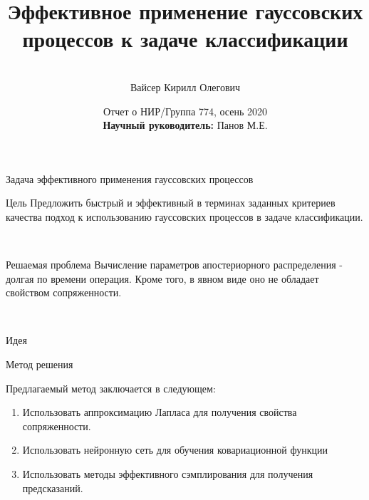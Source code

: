 \documentclass[hyperref={unicode}]{beamer}
\title[\hbox to 56mm{Эффективное применение гауссовских процессов \hfill\insertframenumber\,/\,\inserttotalframenumber}]
{Эффективное применение гауссовских процессов к задаче классификации}
\author[К.\,О. Вайсер]{\large \\Вайсер Кирилл Олегович}
\institute{\large
Московский физико-технический институт}
\date{\footnotesize{Отчет о НИР/Группа 774, осень 2020\\\textbf{Научный руководитель:} Панов М.Е.}}
\begin{document}
\begin{frame}
\titlepage
\end{frame}
\begin{frame}{Задача эффективного применения гауссовских процессов}

\begin{block}{Цель}
Предложить быстрый и эффективный в терминах заданных критериев качества подход к использованию гауссовских процессов в задаче классификации.
\end{block}

~\\
\begin{block}{Решаемая проблема}
Вычисление параметров апостериорного распределения - долгая по времени операция. Кроме того, в явном виде оно не обладает свойством сопряженности.
\end{block}

~\\


\end{frame}
\begin{frame}{Идея}
		\begin{block}{Метод решения}

	Предлагаемый метод заключается в следующем:
	\begin{enumerate}
		\item
		Использовать аппроксимацию Лапласа для получения свойства сопряженности.
		\item
		Использовать нейронную сеть для обучения ковариационной функции
		\item 
		Использовать методы эффективного сэмплирования для получения предсказаний.
	\end{enumerate}
	\end{block}
	
	
    
	\end{frame}
	

\end{document}

